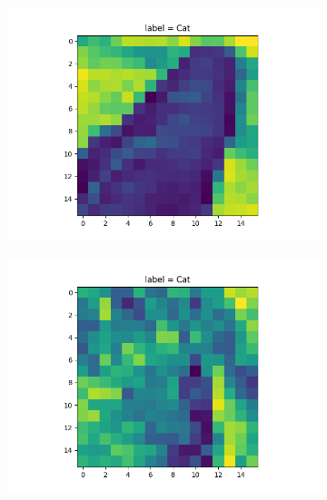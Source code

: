 \documentclass{article}
\begin{document}
\begin{figure}[H]
\begin{subfigure}{.5\textwidth}
  \centering
  \includegraphics[width=1\linewidth]{2b/Box num 3.png}  
  
  \label{fig:sub-first}
\end{subfigure}
\begin{subfigure}{.5\textwidth}
  \centering
  \includegraphics[width=1\linewidth]{2b/box num 5.png}  
  
  \label{fig:sub-second}
\end{subfigure}


\end{figure}
\end{document}
